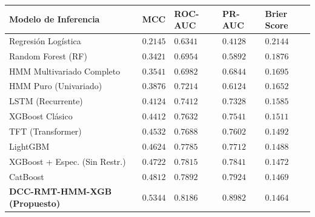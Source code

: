 \documentclass[
  12pt,
]{article}
\newcounter{none} %
\begin{document}
{\def\LTcaptype{none} %
\begin{longtable}[]{@{}
  >{\raggedright\arraybackslash}p{}
  >{\centering\arraybackslash}p{}
  >{\centering\arraybackslash}p{}
  >{\centering\arraybackslash}p{}
  >{\centering\arraybackslash}p{}@{}}
\toprule\noalign{}
\begin{minipage}[b]{\linewidth}\raggedright
Modelo de Inferencia
\end{minipage} & \begin{minipage}[b]{\linewidth}\centering
MCC
\end{minipage} & \begin{minipage}[b]{\linewidth}\centering
ROC-AUC
\end{minipage} & \begin{minipage}[b]{\linewidth}\centering
PR-AUC
\end{minipage} & \begin{minipage}[b]{\linewidth}\centering
Brier Score
\end{minipage} \\
\midrule\noalign{}
\endhead
\bottomrule\noalign{}
\endlastfoot
Regresión Logística & \(0.2145\) & \(0.6341\) & \(0.4128\) &
\(0.2144\) \\
Random Forest (RF) & \(0.3421\) & \(0.6954\) & \(0.5892\) &
\(0.1876\) \\
HMM Multivariado Completo & \(0.3541\) & \(0.6982\) & \(0.6844\) &
\(0.1695\) \\
HMM Puro (Univariado) & \(0.3876\) & \(0.7214\) & \(0.6124\) &
\(0.1652\) \\
LSTM (Recurrente) & \(0.4124\) & \(0.7412\) & \(0.7328\) & \(0.1585\) \\
XGBoost Clásico & \(0.4412\) & \(0.7632\) & \(0.7541\) & \(0.1511\) \\
TFT (Transformer) & \(0.4532\) & \(0.7688\) & \(0.7602\) & \(0.1492\) \\
LightGBM & \(0.4624\) & \(0.7785\) & \(0.7712\) & \(0.1488\) \\
XGBoost + Espec. (Sin Restr.) & \(0.4722\) & \(0.7815\) & \(0.7841\) &
\(0.1472\) \\
CatBoost & \(0.4812\) & \(0.7892\) & \(0.7924\) & \(0.1469\) \\
\textbf{DCC-RMT-HMM-XGB (Propuesto)} & \textbf{\(0.5344\)} &
\textbf{\(0.8186\)} & \textbf{\(0.8982\)} & \textbf{\(0.1464\)} \\
\end{longtable}
}
\end{document}
